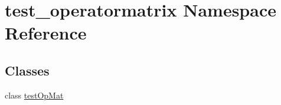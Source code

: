 \hypertarget{namespacetest__operatormatrix}{}\section{test\+\_\+operatormatrix Namespace Reference}
\label{namespacetest__operatormatrix}
\subsection*{Classes}
\begin{DoxyCompactItemize}
\item 
class \hyperlink{classtest__operatormatrix_1_1testOpMat}{test\+Op\+Mat}
\end{DoxyCompactItemize}
